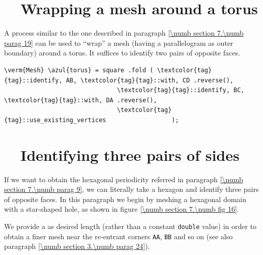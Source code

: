 \section{~~Wrapping a mesh around a torus}\label{\numb section 7.\numb parag 20}

A process similar to the one described in paragraph \ref{\numb section 7.\numb parag 19}
can be used to ``wrap'' a mesh (having a parallelogram as outer boundary) around
a torus.
It suffices to identify two pairs of opposite faces.
\vskip 5mm

\begin{Verbatim}[commandchars=\\\{\},formatcom=\small\tt,frame=single,
   label=parag-\ref{\numb section 7.\numb parag 20}.cpp,rulecolor=\color{moldura},
   baselinestretch=0.94,framesep=2mm                                             ]
   \verm{Mesh} \azul{torus} = square .fold ( \textcolor{tag}{tag}::identify, AB, \textcolor{tag}{tag}::with, CD .reverse(),
                               \textcolor{tag}{tag}::identify, BC, \textcolor{tag}{tag}::with, DA .reverse(),
                               \textcolor{tag}{tag}::use_existing_vertices                  );
\end{Verbatim}


\section{~~Identifying three pairs of sides}\label{\numb section 7.\numb parag 21}

If we want to obtain the hexagonal periodicity referred in paragraph
\ref{\numb section 7.\numb parag 9}, we can literally take a hexagon and
identify three pairs of opposite faces.
In this paragraph we begin by meshing a hexagonal domain with a star-shaped hole,
as shown in figure \ref{\numb section 7.\numb fig 16}.

We provide a {\small\tt{}} as desired length
(rather than a constant {\small\tt double} value) in order to obtain a finer mesh near the
re-entrant corners {\small\tt AA}, {\small\tt BB} and so on
(see also paragraph \ref{\numb section 3.\numb parag 24}).


